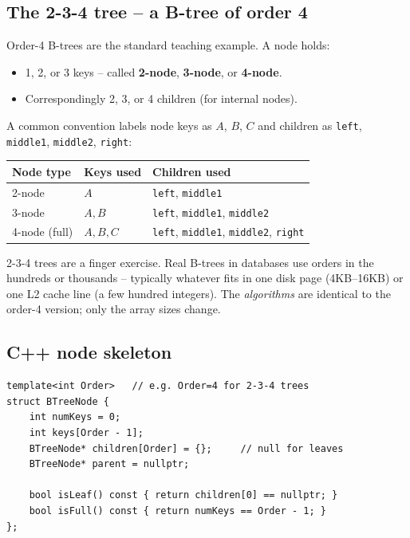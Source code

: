 \documentclass[11pt]{article}
\begin{document}
\subsection*{The 2-3-4 tree -- a B-tree of order 4}

Order-4 B-trees are the standard teaching example. A node holds:
\begin{itemize}[leftmargin=*]
    \item 1, 2, or 3 keys -- called \textbf{2-node}, \textbf{3-node}, or \textbf{4-node}.
    \item Correspondingly 2, 3, or 4 children (for internal nodes).
\end{itemize}

A common convention labels node keys as $A$, $B$, $C$ and children as \texttt{left}, \texttt{middle1}, \texttt{middle2}, \texttt{right}:

\begin{center}
\begin{tabular}{lll}
\hline
Node type & Keys used & Children used \\
\hline
2-node & $A$ & \texttt{left}, \texttt{middle1} \\
3-node & $A, B$ & \texttt{left}, \texttt{middle1}, \texttt{middle2} \\
4-node (full) & $A, B, C$ & \texttt{left}, \texttt{middle1}, \texttt{middle2}, \texttt{right} \\
\hline
\end{tabular}
\end{center}

\begin{ideabox}
2-3-4 trees are a finger exercise. Real B-trees in databases use orders in the hundreds or thousands -- typically whatever fits in one disk page (4KB--16KB) or one L2 cache line (a few hundred integers). The \emph{algorithms} are identical to the order-4 version; only the array sizes change.
\end{ideabox}

\subsection*{C++ node skeleton}

\begin{lstlisting}[basicstyle=\ttfamily\small,frame=single]
template<int Order>   // e.g. Order=4 for 2-3-4 trees
struct BTreeNode {
    int numKeys = 0;
    int keys[Order - 1];
    BTreeNode* children[Order] = {};     // null for leaves
    BTreeNode* parent = nullptr;

    bool isLeaf() const { return children[0] == nullptr; }
    bool isFull() const { return numKeys == Order - 1; }
};
\end{lstlisting}
\end{document}
